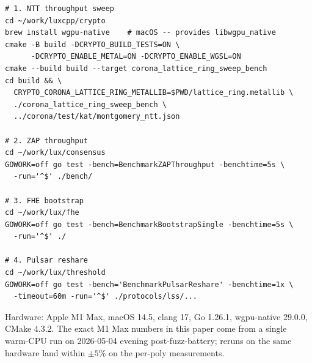 \begin{lstlisting}[basicstyle=\small\ttfamily,frame=single,
                   xleftmargin=0pt, framesep=4pt]
# 1. NTT throughput sweep
cd ~/work/luxcpp/crypto
brew install wgpu-native    # macOS -- provides libwgpu_native
cmake -B build -DCRYPTO_BUILD_TESTS=ON \
      -DCRYPTO_ENABLE_METAL=ON -DCRYPTO_ENABLE_WGSL=ON
cmake --build build --target corona_lattice_ring_sweep_bench
cd build && \
  CRYPTO_CORONA_LATTICE_RING_METALLIB=$PWD/lattice_ring.metallib \
  ./corona_lattice_ring_sweep_bench \
  ../corona/test/kat/montgomery_ntt.json

# 2. ZAP throughput
cd ~/work/lux/consensus
GOWORK=off go test -bench=BenchmarkZAPThroughput -benchtime=5s \
  -run='^$' ./bench/

# 3. FHE bootstrap
cd ~/work/lux/fhe
GOWORK=off go test -bench=BenchmarkBootstrapSingle -benchtime=5s \
  -run='^$' ./

# 4. Pulsar reshare
cd ~/work/lux/threshold
GOWORK=off go test -bench='BenchmarkPulsarReshare' -benchtime=1x \
  -timeout=60m -run='^$' ./protocols/lss/...
\end{lstlisting}

Hardware: Apple M1 Max, macOS 14.5, clang 17, Go 1.26.1,
wgpu-native 29.0.0, CMake 4.3.2. The exact M1 Max numbers in
this paper come from a single warm-CPU run on 2026-05-04 evening
post-fuzz-battery; reruns on the same hardware land within $\pm 5\%$
on the per-poly measurements.
